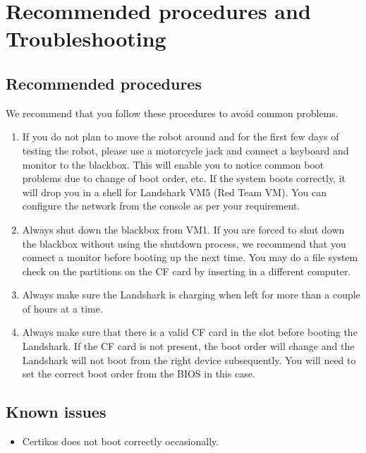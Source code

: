 \chapter{Recommended procedures and Troubleshooting}

\section{Recommended procedures}
We recommend that you follow these procedures to avoid common problems.
\begin{enumerate}
  \item If you do not plan to move the robot around and for the first few days of testing the
    robot, please use a motorcycle jack and connect a keyboard and monitor to the blackbox. This
    will enable you to notice common boot problems due to change of boot order, etc. If
    the system boots correctly, it will drop you in a shell for Landshark VM5 (Red Team VM). You
    can configure the network from the console as per your requirement.
  \item Always shut down the blackbox from VM1. If you are forced to shut down the blackbox without
    using the shutdown process, we recommend that you connect a monitor before booting up the
    next time. You may do a file system check on the partitions on the CF card by inserting in a
    different computer.
  \item Always make sure the Landshark is charging when left for more than a couple of hours at a
    time.
  \item Always make sure that there is a valid CF card in the slot before booting the Landshark.
    If the CF card is not present, the boot order will change and the Landshark will not boot
    from the right device subsequently. You will need to set the correct boot order from the
    BIOS in this case.
\end{enumerate}


\section{Known issues}
\begin{itemize}
  \item Certikos does not boot correctly occasionally.
\end{itemize}


